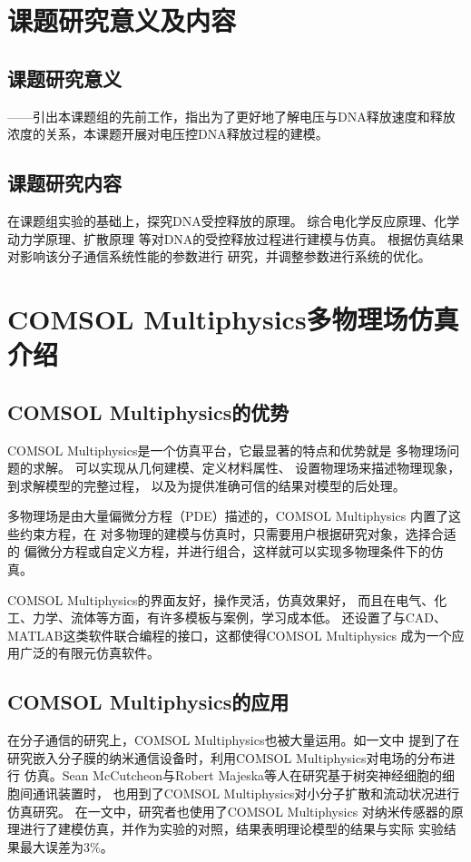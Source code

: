 \section{课题研究意义及内容}
\subsection{课题研究意义}
——引出本课题组的先前工作，指出为了更好地了解电压与DNA释放速度和释放浓度的关系，本课题开展对电压控DNA释放过程的建模。
\subsection{课题研究内容}
在课题组实验的基础上，探究DNA受控释放的原理。
综合电化学反应原理、化学动力学原理、扩散原理
等对DNA的受控释放过程进行建模与仿真。
根据仿真结果对影响该分子通信系统性能的参数进行
研究，并调整参数进行系统的优化。

\section{COMSOL Multiphysics多物理场仿真介绍}
\subsection{COMSOL Multiphysics的优势}
COMSOL Multiphysics是一个仿真平台，它最显著的特点和优势就是
多物理场问题的求解\cite{李淑君2014基于}。
可以实现从几何建模、定义材料属性、
设置物理场来描述物理现象，到求解模型的完整过程，
以及为提供准确可信的结果对模型的后处理。

多物理场是由大量偏微分方程（PDE）描述的，COMSOL Multiphysics
内置了这些约束方程，在
对多物理的建模与仿真时，只需要用户根据研究对象，选择合适的
偏微分方程或自定义方程，并进行组合，这样就可以实现多物理条件下的仿真\cite{王瑞2013基于}。

COMSOL Multiphysics的界面友好，操作灵活，仿真效果好，
而且在电气、化工、力学、流体等方面，有许多模板与案例，学习成本低。
还设置了与CAD、MATLAB这类软件联合编程的接口，这都使得COMSOL Multiphysics
成为一个应用广泛的有限元仿真软件。
\subsection{COMSOL Multiphysics的应用}
在分子通信的研究上，COMSOL Multiphysics也被大量运用。如\parencite{10.1007/978-3-319-67380-6_19}一文中
提到了在研究嵌入分子膜的纳米通信设备时，利用COMSOL Multiphysics对电场的分布进行
仿真。Sean McCutcheon与Robert Majeska等人在研究基于树突神经细胞的细胞间通讯装置时，
也用到了COMSOL Multiphysics对小分子扩散和流动状况进行仿真研究\cite{McCutcheon2017}。
在\parencite{10.1007/978-81-322-1007-8_56}一文中，研究者也使用了COMSOL Multiphysics
对纳米传感器的原理进行了建模仿真，并作为实验的对照，结果表明理论模型的结果与实际
实验结果最大误差为3\%。

